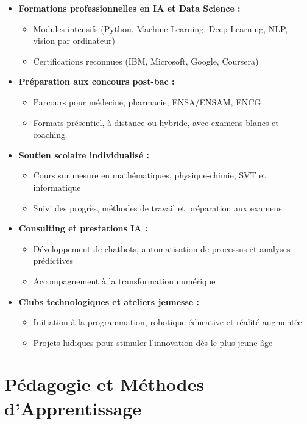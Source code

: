 \begin{itemize}
  \item \textbf{Formations professionnelles en IA et Data Science :}
  \begin{itemize}
    \item Modules intensifs (Python, Machine Learning, Deep Learning, NLP, vision par ordinateur)
    \item Certifications reconnues (IBM, Microsoft, Google, Coursera)
  \end{itemize}
  
  \item \textbf{Préparation aux concours post-bac :}
  \begin{itemize}
    \item Parcours pour médecine, pharmacie, ENSA/ENSAM, ENCG
    \item Formats présentiel, à distance ou hybride, avec examens blancs et coaching
  \end{itemize}
  
  \item \textbf{Soutien scolaire individualisé :}
  \begin{itemize}
    \item Cours sur mesure en mathématiques, physique-chimie, SVT et informatique
    \item Suivi des progrès, méthodes de travail et préparation aux examens
  \end{itemize}
  
  \item \textbf{Consulting et prestations IA :}
  \begin{itemize}
    \item Développement de chatbots, automatisation de processus et analyses prédictives
    \item Accompagnement à la transformation numérique
  \end{itemize}
  
  \item \textbf{Clubs technologiques et ateliers jeunesse :}
  \begin{itemize}
    \item Initiation à la programmation, robotique éducative et réalité augmentée
    \item Projets ludiques pour stimuler l'innovation dès le plus jeune âge
  \end{itemize}
\end{itemize}

\section{Pédagogie et Méthodes d'Apprentissage}

